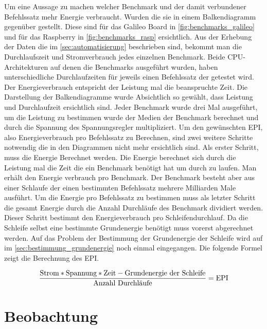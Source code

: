 Um eine Aussage zu machen welcher Benchmark und der damit verbundener Befehlssatz mehr Energie verbraucht. Wurden die sie in einem Balkendiagramm gegenüber gestellt. Diese sind für das Galileo Board in \autoref{fig:benchmarks_galileo} und für das Raspberry in \autoref{fig:benchmarks_rasp} ersichtlich. Aus der Erhebung der Daten die im \autoref{sec:automatisierung} beschrieben sind, bekommt man die Durchlaufszeit und Stromverbrauch jedes einzelnen Benchmark. Beide CPU-Architekturen auf denen die Benchmarks ausgeführt wurden, haben unterschiedliche Durchlaufzeiten für jeweils einen Befehlssatz der getestet wird. Der Energieverbrauch entspricht der Leistung mal die beanspruchte Zeit. Die Darstellung der Balkendiagramme wurde Absichtlich so gewählt, dass Leistung und Durchlaufzeit ersichtlich sind. Jeder Benchmark wurde drei Mal ausgeführt, um die Leistung zu bestimmen wurde der Medien der Benchmark berechnet und durch die Spannung des Spannungsregler multipliziert. Um den gewünschten EPI, also Energieverbrauch pro Befehlssatz zu Berechnen, sind zwei weitere Schritte notwendig die in den Diagrammen nicht mehr ersichtlich sind. Als erster Schritt, muss die Energie Berechnet werden. Die Energie berechnet sich durch die Leistung mal die Zeit die ein Benchmark benötigt hat um durch zu laufen. Man erhält den Energie verbrauch pro Benchmark. Der Benchmark besteht aber aus einer Schlaufe der einen bestimmten Befehlssatz mehrere Milliarden Male ausführt. Um die Energie pro Befehlssatz zu bestimmen muss als letzter Schritt die gesamt Energie durch die Anzahl Durchläufe des Benchmark dividiert werden. Dieser Schritt bestimmt den Energieverbrauch pro Schleifendurchlauf. Da die Schleife selbst eine bestimmte Grundenergie benötigt muss vorerst abgerechnet werden. Auf das Problem der Bestimmung der Grundenergie der Schleife wird auf im \autoref{sec:bestimmung_grundenergie} noch einmal eingegangen. Die folgende Formel zeigt die Berechnung des EPI.

\[ \frac{\textnormal{Strom} * \textnormal{Spannung} * \textnormal{Zeit} - \textnormal{Grundenergie der Schleife}}{\textnormal{Anzahl Durchl{\"a}ufe}} = \textnormal{EPI} \]









\section{Beobachtung}

